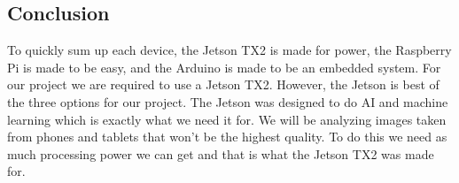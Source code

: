 \documentclass[onecolumn, draftclsnofoot,10pt, compsoc]{IEEEtran}
\begin{document}
	\subsection{Conclusion}
		To quickly sum up each device, the Jetson TX2 is made for power, the Raspberry Pi is made to be easy, and the Arduino is made to be an embedded system.
		For our project we are required to use a Jetson TX2.
		However, the Jetson is best of the three options for our project.
		The Jetson was designed to do AI and machine learning which is exactly what we need it for.
		We will be analyzing images taken from phones and tablets that won't be the highest quality.
		To do this we need as much processing power we can get and that is what the Jetson TX2 was made for.



\end{document}
